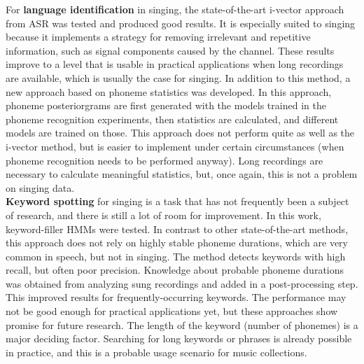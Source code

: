 For \textbf{language identification} in singing, the state-of-the-art i-vector approach from ASR was tested and produced good results. It is especially suited to singing because it implements a strategy for removing irrelevant and repetitive information, such as signal components caused by the channel. These results improve to a level that is usable in practical applications when long recordings are available, which is usually the case for singing. In addition to this method, a new approach based on phoneme statistics was developed. In this approach, phoneme posteriorgrams are first generated with the models trained in the phoneme recognition experiments, then statistics are calculated, and different models are trained on those. This approach does not perform quite as well as the i-vector method, but is easier to implement under certain circumstances (when phoneme recognition needs to be performed anyway). Long recordings are necessary to calculate meaningful statistics, but, once again, this is not a problem on singing data.\\

\textbf{Keyword spotting} for singing is a task that has not frequently been a subject of research, and there is still a lot of room for improvement. In this work, keyword-filler HMMs were tested. In contrast to other state-of-the-art methods, this approach does not rely on highly stable phoneme durations, which are very common in speech, but not in singing. The method detects keywords with high recall, but often poor precision. Knowledge about probable phoneme durations was obtained from analyzing sung recordings and added in a post-processing step. This improved results for frequently-occurring keywords. The performance may not be good enough for practical applications yet, but these approaches show promise for future research. The length of the keyword (number of phonemes) is a major deciding factor. Searching for long keywords or phrases is already possible in practice, and this is a probable usage scenario for music collections.\\

